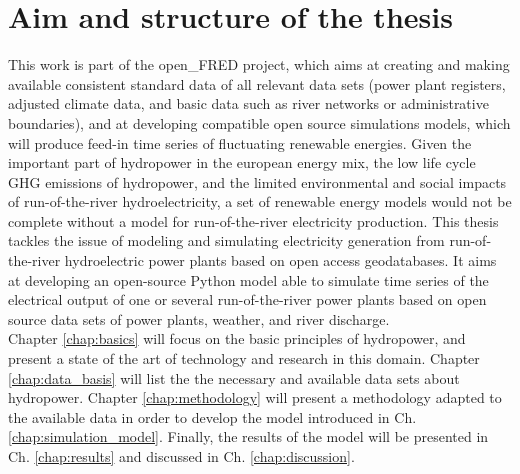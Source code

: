 \section{Aim and structure of the thesis}
This work is part of the open\_FRED project, which aims at creating and making available consistent standard data of all relevant data sets (power plant registers, adjusted climate data, and basic data such as river networks or administrative boundaries), and at developing compatible open source simulations models, which will produce feed-in time series of fluctuating renewable energies. \newline
Given the important part of hydropower in the european energy mix, the low life cycle GHG emissions of hydropower, and the limited environmental and social impacts of run-of-the-river hydroelectricity, a set of renewable energy models would not be complete without a model for run-of-the-river electricity production. \newline
This thesis tackles the issue of modeling and simulating electricity generation from run-of-the-river hydroelectric power plants based on open access geodatabases. It aims at developing an open-source Python model able to simulate time series of the electrical output of one or several run-of-the-river power plants based on open source data sets of power plants, weather, and river discharge. \\
Chapter \ref{chap:basics} will focus on the basic principles of hydropower, and present a state of the art of technology and research in this domain. Chapter \ref{chap:data_basis} will list the the necessary and available data sets about hydropower. Chapter \ref{chap:methodology} will present a methodology adapted to the available data in order to develop the model introduced in Ch. \ref{chap:simulation_model}. Finally, the results of the model will be presented in Ch. \ref{chap:results} and discussed in Ch. \ref{chap:discussion}.

